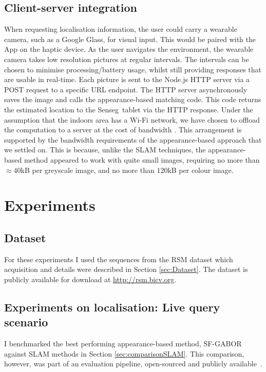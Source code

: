 \subsection{Client-server integration}
\label{sec:5}
When requesting localisation information, the user could carry a wearable camera, such as a Google Glass, for visual input. This would be paired with the App on the haptic device. As the user navigates the environment, the wearable camera takes low resolution pictures at regular  intervals. The intervals can be chosen to minimise processing/battery usage, whilst still providing responses that are usable in real-time. Each picture is sent to the Node.js HTTP server via a POST request to a specific URL endpoint. The HTTP server asynchronously saves the image and calls the appearance-based matching code. This code returns the estimated location to the Senseg\texttrademark\ tablet via the HTTP response. Under the assumption that the indoors area has a Wi-Fi network, we have chosen to offload the computation to a server at the cost of bandwidth \citep{simske2013meta}. This arrangement is supported by the bandwidth requirements of the appearance-based approach that we settled on. This is because, unlike the SLAM techniques, the appearance-based method appeared to work with quite small images, requiring no more than $\approx 40$kB per greyscale image, and no more than $120$kB per colour image.


\section{Experiments}
\label{sec:experiments}

\subsection{Dataset}
For these experiments I used the sequences from the RSM dataset which acquisition and details were described in Section \ref{sec:Dataset}. The dataset is publicly available for download at \url{http://rsm.bicv.org}.


\subsection{Experiments on localisation: Live query scenario}

I benchmarked the best performing appearance-based method, SF-GABOR against SLAM methods in Section \ref{sec:comparisonSLAM}. This comparison, however, was part of an evaluation pipeline, open-sourced and publicly available~\cite{jose_rivera_rubio_2015_33762}.

